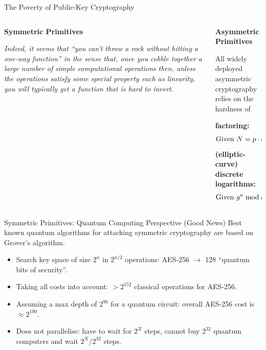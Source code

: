 \documentclass[xcolor=table,10pt,aspectratio=169]{beamer}
\begin{document}
\begin{frame}[label={sec:org73c14c5}]{The Poverty of Public-Key Cryptography}
\begin{columns}[t]
\begin{column}{0.5\columnwidth}
\textbf{Symmetric Primitives}

\phantom{M}

\emph{Indeed, it seems that “you can’t throw a rock without hitting a one-way function” in the sense that, once you cobble together a large number of simple computational operations then, unless the operations satisfy some special property such as linearity, you will typically get a function that is hard to invert}.
\end{column}


\begin{column}{0.5\columnwidth}
\textbf{Asymmetric Primitives}

\phantom{M}

All widely deployed asymmetric cryptography relies on the hardness of 

\textbf{factoring:} \[\textnormal{Given } N = p \cdot q \textnormal{ find } p, \textnormal{ or }\]
\textbf{(elliptic-curve) discrete logarithms:} \[\textnormal{Given }  g^a  \bmod q \textnormal{ and } g \textnormal{ find } a.\]
\end{column}
\end{columns}
\end{frame}

\begin{frame}[label={sec:orgf615b92}]{Symmetric Primitives: Quantum Computing Perspective (Good News)}
Best known quantum algorithms for attacking symmetric cryptography are based on Grover’s algorithm. 

\begin{itemize}
\item Search key space of size \(2^n\) in \(2^{n/2}\) operations: AES-256 \(\rightarrow\) 128 “quantum bits of security”.
\item Taking all costs into account: \(> 2^{152}\) classical operations for AES-256.
\item Assuming a max depth of \(2^{96}\) for a quantum circuit: overall AES-256 cost is \(\approx 2^{190}\).
\item Does not parallelise: have to wait for \(2^{X}\) steps, cannot buy \(2^{32}\) quantum computers and wait \(2^X / 2^{32}\) steps.
\end{itemize}
\end{frame}
\end{document}

